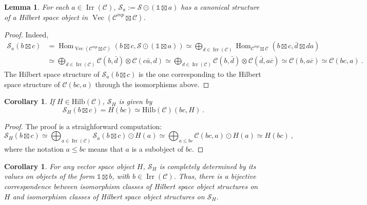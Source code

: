 \documentclass[a4paper,11pt,reqno]{amsart}
\numberwithin{equation}{section}
\newtheorem{corollary}[theorem]{Corollary}
\newtheorem{lemma}[theorem]{Lemma}
\theoremstyle{remark}
\theoremstyle{definition}
\newcommand{\cC}{\mathcal C}
\newcommand{\cS}{\mathcal S}
\DeclareMathOperator{\Hom}{Hom}
\DeclareMathOperator{\Irr}{Irr}
\DeclareMathOperator{\Vect}{Vec}
\newcommand\un{{\mathds 1}}
\newcommand{\Hilb}{\mathrm{Hilb}}
\begin{document}
\begin{lemma}
    For each $a \in \Irr(\cC)$, $\cS_a:= \cS \odot ( \un \boxtimes a)$ has a canonical structure of a Hilbert space object in $\Vect(\cC^{mp} \boxtimes \cC)$.
\end{lemma}
 \begin{proof}
 Indeed,
 \begin{align*}
\cS_a (b \boxtimes c) & = \Hom_{\Vect(\cC^{mp} \boxtimes \cC)} (b \boxtimes c, \cS \odot (\un \boxtimes a))  \simeq \bigoplus_{d \in \Irr(\cC)} \Hom_{\cC^{mp} \boxtimes \cC} (b \boxtimes c, \bar{d} \boxtimes da) \\
& \simeq \bigoplus_{d \in \Irr(\cC)} \cC(b,\bar{d}) \otimes \cC(c \bar{a},d) \simeq  \bigoplus_{d \in \Irr(\cC)} \cC(b,\bar{d}) \otimes \cC(\overline{d},a \overline{c}) \simeq \cC(b,a \overline{c}) \simeq \cC(bc,a) \ .
\end{align*}
The Hilbert space structure of $\cS_a (b \boxtimes c)$ is the one corresponding to the Hilbert space structure of $\cC(bc,a)$ through the isomorphisms above.
\end{proof}



\begin{corollary}
    If $H \in \Hilb(\cC)$, $\cS_H$ is given by
    \[
    \cS_H(b \boxtimes c) = H(bc) \simeq \Hilb(\cC)(bc, H) \ .
    \]
\end{corollary}
\begin{proof}
The proof is a straighforward computation:
    \[ \cS_H(b \boxtimes c) \simeq \bigoplus_{a \in \Irr(\cC)} \cS_a(b \boxtimes c) \odot H(a) \simeq \bigoplus_{a \leq bc}\cC(bc,a) \odot H(a) \simeq H(bc) \ ,\]
    where the notation $a \leq bc$ means that $a$ is a subobject of $bc$.
\end{proof}

\begin{corollary}
	For any vector space object $H$, $\cS_H$ is completely determined by its values on objects of the form $\un \boxtimes b$, with $b \in \Irr(\cC)$. Thus, there is a bijective correspondence between isomorphism classes of Hilbert space object structures on $H$ and isomorphism classes of Hilbert space object structures on  $\cS_H$.
	\label{cor:equivalencebetweenHilbertspacestronHandonS_H}
\end{corollary}
\medskip
\end{document}

